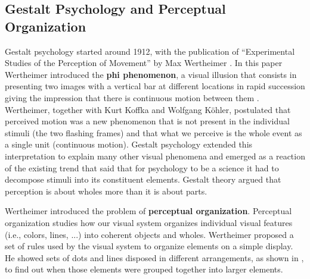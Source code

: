 \subsection{Gestalt Psychology and Perceptual Organization}


Gestalt psychology 
started around 1912, with the publication of “Experimental Studies of the Perception of Movement” by Max Wertheimer \cite{wertheimer1912experimentelle}. In this paper Wertheimer introduced the {\bf phi phenomenon}, a visual illusion that consists in presenting two images with a vertical bar at different locations in rapid succession giving the impression that there is continuous motion between them \cite{steinman2000phi}. 
Wertheimer, together with Kurt Koffka and Wolfgang Köhler, postulated that perceived motion was a new phenomenon that is not present in the individual stimuli (the two flashing frames) and that what we perceive is the whole event as a single unit (continuous motion). Gestalt psychology extended this interpretation to explain many other visual phenomena and emerged as a reaction of the existing trend that said that for psychology to be a science it had to decompose stimuli into its constituent elements. Gestalt theory argued that perception is about wholes more than it is about parts.



Wertheimer introduced the problem of {\bf perceptual organization}. 
Perceptual organization studies how our visual system organizes individual visual features (i.e., colors, lines, ...) into coherent objects and wholes. Wertheimer proposed a set of rules
used by the visual system to organize elements on a simple display. He showed sets of dots and lines disposed in different arrangements, as shown in \fig{\ref{fig:gestalt}}, to find out when those elements were grouped together into larger elements.  


